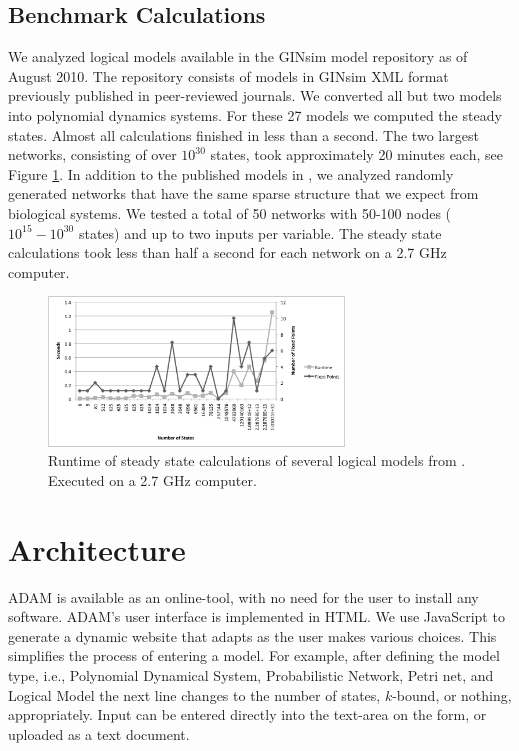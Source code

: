 \documentclass[10pt]{bmc_article}
\begin{document}
\subsection{Benchmark Calculations}
We analyzed logical models
available in the GINsim model repository \cite{GINsimRepo} as of August 2010. The
repository consists of models in GINsim XML format previously published in
peer-reviewed journals. We converted all but two models into polynomial
dynamics systems. For these 27 models we computed the steady states. Almost all
calculations finished in less than a second. The two largest networks,
consisting of over $10^{30}$ states, took approximately 20 minutes each, see
Figure \ref{fig:chart}.
In addition to the published models in \cite{GINsimRepo}, we analyzed
randomly generated networks
that have the same sparse structure that we
expect from biological systems. We tested a total of 50 networks with
50-100 nodes ($10^{15} - 10^{30}$ states) and up to two inputs per variable. The
steady state calculations took less than half a second for each network on
a 2.7 GHz computer.
\begin{figure}[htb]
\centering
\includegraphics[width=0.7\textwidth]{GINSimChart.png}
\caption{Runtime of steady state calculations of several logical models from
\cite{GINsimRepo}. Executed on a 2.7 GHz computer.}
\label{fig:chart}
\end{figure}

\section{Architecture}
ADAM is available as an online-tool, with no need for the user to install any software. ADAM's user interface is implemented in HTML. We use JavaScript to generate a dynamic website that adapts as the user makes various choices. This simplifies the process of entering a model. For example, after defining the model type, i.e., Polynomial Dynamical System, Probabilistic Network, Petri net, and Logical Model the next line changes to the number of states, $k$-bound, or nothing, appropriately. Input can be entered directly into the text-area on the form, or uploaded as a text document.
\end{document}
